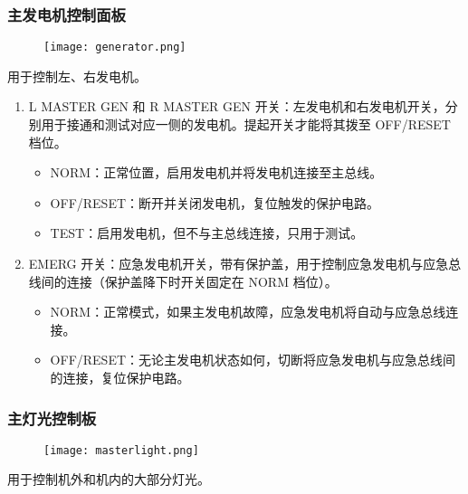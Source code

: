 \subsubsection{主发电机控制面板}

\begin{figure}[htb]
  \center
  \texttt{[image: generator.png]}
\end{figure}
用于控制左、右发电机。

\begin{enumerate}
  \item L MASTER GEN 和 R MASTER GEN 开关：左发电机和右发电机开关，分别用于接通和测试对应一侧的发电机。提起开关才能将其拨至 OFF/RESET 档位。
  \begin{itemize}
    \item NORM：正常位置，启用发电机并将发电机连接至主总线。
    \item OFF/RESET：断开并关闭发电机，复位触发的保护电路。
    \item TEST：启用发电机，但不与主总线连接，只用于测试。
  \end{itemize}
  \item EMERG 开关：应急发电机开关，带有保护盖，用于控制应急发电机与应急总线间的连接（保护盖降下时开关固定在 NORM 档位）。
  \begin{itemize}
    \item NORM：正常模式，如果主发电机故障，应急发电机将自动与应急总线连接。
    \item OFF/RESET：无论主发电机状态如何，切断将应急发电机与应急总线间的连接，复位保护电路。
  \end{itemize}
\end{enumerate}

\subsubsection{主灯光控制板}

\begin{figure}[htb]
  \center
  \texttt{[image: masterlight.png]}
\end{figure}
用于控制机外和机内的大部分灯光。

